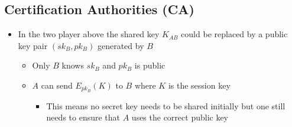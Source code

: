 \documentclass[11pt]{article}
\begin{document}
\subsection{Certification Authorities (CA)}
\label{sec:orgebf1f89}
\begin{itemize}
\item In the two player above the shared key \(K_{AB}\) could be replaced by a public key pair \((sk_B,pk_B)\) generated by \(B\)
\begin{itemize}
\item Only \(B\) knows \(sk_B\) and \(pk_B\) is public
\item \(A\) can send \(E_{pk_B}(K)\) to \(B\) where \(K\) is the session key
\begin{itemize}
\item This means no secret key needs to be shared initially but one still needs to ensure that \(A\) uses the correct public key
\end{itemize}
\end{itemize}


\end{itemize}
\end{document}
